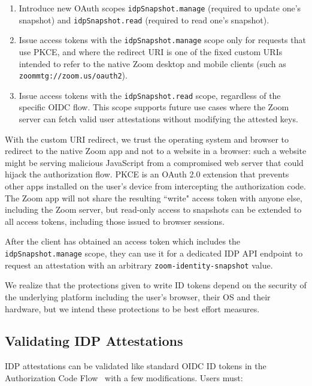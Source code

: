 \begin{enumerate}
\item Introduce new OAuth scopes \texttt{idpSnapshot.manage} (required to update one's snapshot) and
    \texttt{idpSnapshot.read} (required to read one's snapshot).
\item Issue access tokens with the \texttt{idpSnapshot.manage} scope only for requests that use
    PKCE, and where the redirect URI is one of the fixed custom URIs intended to refer to the native
    Zoom desktop and mobile clients (such as \texttt{zoommtg://zoom.us/oauth2}).
\item Issue access tokens with the \texttt{idpSnapshot.read} scope, regardless of the specific OIDC
    flow. This scope supports future use cases where the Zoom server can fetch valid user
    attestations without modifying the attested keys.
\end{enumerate}

With the custom URI redirect, we trust the operating system and browser to redirect to the native
Zoom app and not to a website in a browser: such a website might be serving malicious JavaScript
from a compromised web server that could hijack the authorization flow. PKCE is an OAuth 2.0
extension that prevents other apps installed on the user's device from intercepting the
authorization code. The Zoom app will not share the resulting ``write" access token with anyone
else, including the Zoom server, but read-only access to snapshots can be extended to all access
tokens, including those issued to browser sessions.

After the client has obtained an access token which includes the \texttt{idpSnapshot.manage} scope, they
can use it for a dedicated IDP API endpoint to request an attestation with an arbitrary
\texttt{zoom-identity-snapshot} value.

We realize that the protections given to write ID tokens depend on the security of the underlying
platform including the user's browser, their OS and their hardware, but we intend these protections
to be best effort measures.

\subsection{Validating IDP Attestations}\label{subsec:validateattestation}

IDP attestations can be validated like standard OIDC ID tokens in the Authorization Code
Flow~\cite{oidc} with a few modifications. Users must:

